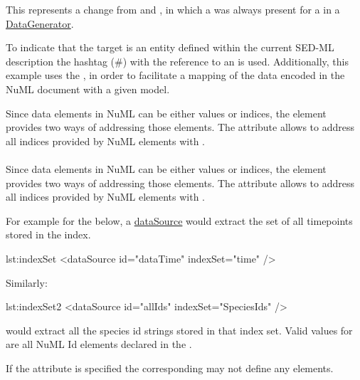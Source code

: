 This represents a change from \LoneVone and \LoneVtwo, in which a  was always present for a  in a \hyperref[class:dataGenerator]{DataGenerator}.

To indicate that the target is an entity defined within the current SED-ML description the hashtag (\#) with the reference to an  is used. Additionally, this example uses the , in order to facilitate a mapping of the data encoded in the NuML document with a given model. 

Since data elements in NuML can be either values or indices, the \SedDataSource element provides two ways of addressing those elements. The \hyperref[sec:indexSet]{} attribute allows to address all indices provided by NuML elements with . 


\paragraph*{}
\label{sec:indexSet}
Since data elements in NuML can be either values or indices, the \SedDataSource element provides two ways of addressing those elements. The  attribute allows to address all indices provided by NuML elements with . 

For example for the   below, a \hyperref[class:dataSource]{dataSource} would extract the set of all timepoints stored in the index.

\begin{myXmlLst}{}{lst:indexSet}
<dataSource id="dataTime" indexSet="time" />
\end{myXmlLst} 

Similarly: 

\begin{myXmlLst}{}{lst:indexSet2}
<dataSource id="allIds" indexSet="SpeciesIds" />
\end{myXmlLst} 

would extract all the species id strings stored in that index set. Valid values for  are all NuML Id elements declared in the . 

If the  attribute is specified the corresponding  may not define any  elements.


